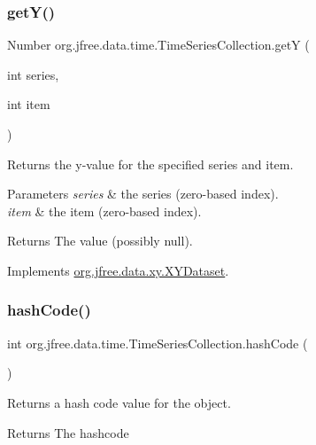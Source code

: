 \subsubsection{\texorpdfstring{get\+Y()}{getY()}}
{\footnotesize\ttfamily Number org.\+jfree.\+data.\+time.\+Time\+Series\+Collection.\+getY (\begin{DoxyParamCaption}\item[{int}]{series,  }\item[{int}]{item }\end{DoxyParamCaption})}

Returns the y-\/value for the specified series and item.


\begin{DoxyParams}{Parameters}
{\em series} & the series (zero-\/based index). \\
\hline
{\em item} & the item (zero-\/based index).\\
\hline
\end{DoxyParams}
\begin{DoxyReturn}{Returns}
The value (possibly {\ttfamily null}). 
\end{DoxyReturn}


Implements \mbox{\hyperlink{interfaceorg_1_1jfree_1_1data_1_1xy_1_1_x_y_dataset_aa915867221e0f94021bad3140db5254e}{org.\+jfree.\+data.\+xy.\+X\+Y\+Dataset}}.

\mbox{\label{classorg_1_1jfree_1_1data_1_1time_1_1_time_series_collection_ab9158d2bf383a4dea0baaa16820293bb}} 
\subsubsection{\texorpdfstring{hash\+Code()}{hashCode()}}
{\footnotesize\ttfamily int org.\+jfree.\+data.\+time.\+Time\+Series\+Collection.\+hash\+Code (\begin{DoxyParamCaption}{ }\end{DoxyParamCaption})}

Returns a hash code value for the object.

\begin{DoxyReturn}{Returns}
The hashcode 
\end{DoxyReturn}
\mbox{\label{classorg_1_1jfree_1_1data_1_1time_1_1_time_series_collection_ac7e87e56f0ab752037451712fbf67efd}} 
